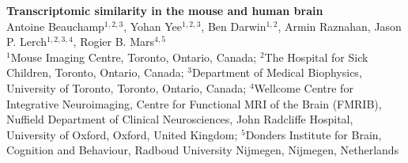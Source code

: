 
\LARGE{\textbf{Transcriptomic similarity in the mouse and human brain}}\\

\large
Antoine Beauchamp$^{1,2,3}$, Yohan Yee$^{1,2,3}$, Ben Darwin$^{1,2}$, Armin Raznahan, Jason P. Lerch$^{1,2,3,4}$, Rogier B. Mars$^{4,5}$\\

\small
$^1$Mouse Imaging Centre, Toronto, Ontario, Canada; $^2$The Hospital for Sick Children, Toronto, Ontario, Canada; $^3$Department of Medical Biophysics, University of Toronto, Toronto, Ontario, Canada; $^4$Wellcome Centre for Integrative Neuroimaging, Centre for Functional MRI of the Brain (FMRIB), Nuffield Department of Clinical Neurosciences, John Radcliffe Hospital, University of Oxford, Oxford, United Kingdom; $^5$Donders Institute for Brain, Cognition and Behaviour, Radboud University Nijmegen, Nijmegen, Netherlands

\normalsize
{}